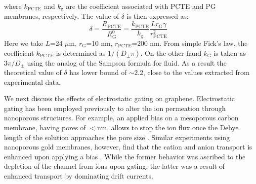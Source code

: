 where $k_{\mathrm{PCTE}}$ and $k_{\mathrm{g}}$ are the coefficient
associated with PCTE and PG membranes, respectively. The value of
$\delta$ is then expressed as:
\begin{equation}
  \label{eq:np-delta-resistance}
  \delta
  = \frac{R_{\mathrm{PCTE}}}{R_{\mathrm{G}}^{0}}
  = {\displaystyle
    \frac{k_{\mathrm{PCTE}}}{k_{\mathrm{g}}}
    \frac{L r_{\mathrm{G}} \gamma}
        {r_{\mathrm{PCTE}}^{2}}}
\end{equation}
Here we take $L$=24 $\mu$m, $r_{\mathrm{G}}$=10 nm,
$r_{\mathrm{PCTE}}$=200 nm. From simple Fick's law, the coefficient
$k_{\mathrm{PCTE}}$ is determined as $1/(D_{\mathrm{\pm}} \pi)$. On
the other hand $k_{\mathrm{G}}$ is taken as $3 \pi / D_{\mathrm{\pm}}$
using the analog of the Sampson formula for
fluid\cite{Roscoe_1949_sampson_formula}. As a result the theoretical
value of $\delta$ has lower bound of $\sim$2.2, close to the values
extracted from experimental data.

  





We next discuss the effects of electrostatic gating on graphene. 
{ Electrostatic gating has been employed previously to alter the 
ion permeation through nanoporous structures. For example, an applied bias on a mesoporous 
carbon membrane, having pores of $<$\unit[5]{nm}, allows to stop the 
ion flux once the Debye length of the solution approaches the pore size \cite{Surwade_2014_carbon_electrochemical_ion}. 
Similar experiments using nanoporous gold membranes, however, find that the cation and anion 
transport is enhanced upon applying a bias \cite{Mccurry_2017_electrolyte_porus_gold}. While the former behavior 
was ascribed to the depletion of the channel from ions upon gating, the latter was a result of enhanced transport
by dominating drift currents.}


